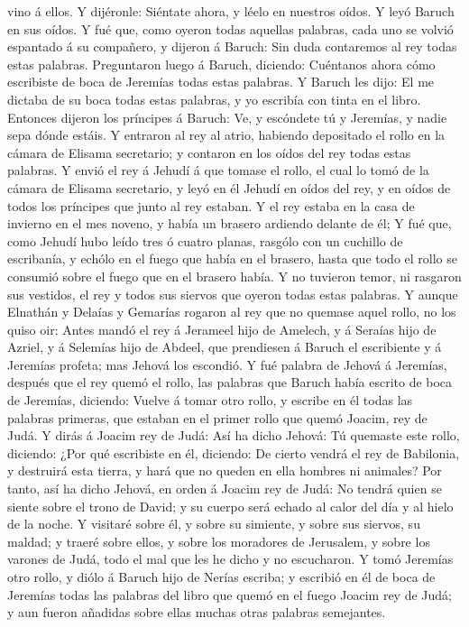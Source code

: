 vino á ellos.  Y dijéronle: Siéntate ahora, y léelo en
nuestros oídos. Y leyó Baruch en sus oídos.  Y fué que,
como oyeron todas aquellas palabras, cada uno se volvió espantado á su
compañero, y dijeron á Baruch: Sin duda contaremos al rey todas estas
palabras.  Preguntaron luego á Baruch, diciendo:
Cuéntanos ahora cómo escribiste de boca de Jeremías todas estas
palabras.  Y Baruch les dijo: El me dictaba de su boca
todas estas palabras, y yo escribía con tinta en el libro.
 Entonces dijeron los príncipes á Baruch: Ve, y escóndete
tú y Jeremías, y nadie sepa dónde estáis.  Y entraron al
rey al atrio, habiendo depositado el rollo en la cámara de Elisama
secretario; y contaron en los oídos del rey todas estas palabras.
 Y envió el rey á Jehudí á que tomase el rollo, el cual
lo tomó de la cámara de Elisama secretario, y leyó en él Jehudí en oídos
del rey, y en oídos de todos los príncipes que junto al rey estaban.
 Y el rey estaba en la casa de invierno en el mes noveno,
y había un brasero ardiendo delante de él;  Y fué que,
como Jehudí hubo leído tres ó cuatro planas, rasgólo con un cuchillo de
escribanía, y echólo en el fuego que había en el brasero, hasta que todo
el rollo se consumió sobre el fuego que en el brasero había.
 Y no tuvieron temor, ni rasgaron sus vestidos, el rey y
todos sus siervos que oyeron todas estas palabras.  Y
aunque Elnathán y Delaías y Gemarías rogaron al rey que no quemase aquel
rollo, no los quiso oir:  Antes mandó el rey á Jerameel
hijo de Amelech, y á Seraías hijo de Azriel, y á Selemías hijo de
Abdeel, que prendiesen á Baruch el escribiente y á Jeremías profeta; mas
Jehová los escondió.  Y fué palabra de Jehová á Jeremías,
después que el rey quemó el rollo, las palabras que Baruch había escrito
de boca de Jeremías, diciendo:  Vuelve á tomar otro
rollo, y escribe en él todas las palabras primeras, que estaban en el
primer rollo que quemó Joacim, rey de Judá.  Y dirás á
Joacim rey de Judá: Así ha dicho Jehová: Tú quemaste este rollo,
diciendo: ¿Por qué escribiste en él, diciendo: De cierto vendrá el rey
de Babilonia, y destruirá esta tierra, y hará que no queden en ella
hombres ni animales?  Por tanto, así ha dicho Jehová, en
orden á Joacim rey de Judá: No tendrá quien se siente sobre el trono de
David; y su cuerpo será echado al calor del día y al hielo de la noche.
 Y visitaré sobre él, y sobre su simiente, y sobre sus
siervos, su maldad; y traeré sobre ellos, y sobre los moradores de
Jerusalem, y sobre los varones de Judá, todo el mal que les he dicho y
no escucharon.  Y tomó Jeremías otro rollo, y diólo á
Baruch hijo de Nerías escriba; y escribió en él de boca de Jeremías
todas las palabras del libro que quemó en el fuego Joacim rey de Judá; y
aun fueron añadidas sobre ellas muchas otras palabras semejantes.

